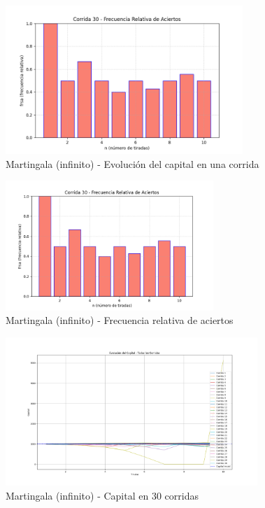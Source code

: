 \documentclass{article}
\begin{document}
\begin{figure}[H]
    \centering
    \includegraphics[width=0.8\textwidth]{./images/frsa_corrida_30_m_i.png}
    \caption{Martingala (infinito) - Evolución del capital en una corrida}
\end{figure}

\begin{figure}[H]
    \centering
    \includegraphics[width=0.7\textwidth]{./images/frsa_corrida_30_m_i.png}
    \caption{Martingala (infinito) - Frecuencia relativa de aciertos}
\end{figure}

\begin{figure}[H]
    \centering
    \includegraphics[width=0.85\textwidth]{./images/capital_todas_corridas_m_i.png}
    \caption{Martingala (infinito) - Capital en 30 corridas}
\end{figure}
\end{document}
